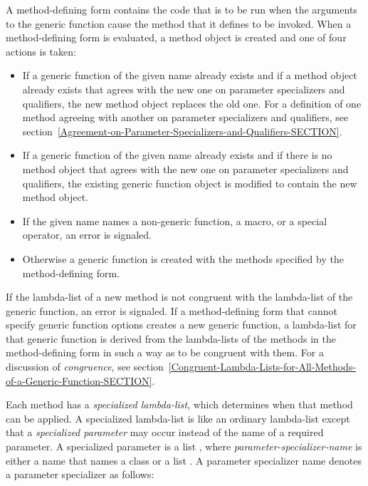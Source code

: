 A method-defining form contains the code that is to be run when the
arguments to the generic function cause the method that it defines to
be invoked.  When a method-defining form is evaluated, a method object
is created and one of four actions is taken:

\begin{itemize}

\item  If a generic function of the given name already exists
and if a method object already exists that agrees with the new one on
parameter specializers and qualifiers, the new method object replaces
the old one.  For a definition of one method agreeing with another on
parameter specializers and qualifiers, see
section~\ref{Agreement-on-Parameter-Specializers-and-Qualifiers-SECTION}.

\item  If a generic function of the given name already exists
and if there is no method object that agrees with the new one on
parameter specializers and qualifiers, the existing generic function
object is modified to contain the new method object.

\item  If the given name names a non-generic function, a macro,
or a special operator, an error is signaled.

\item  Otherwise a generic function is created with the methods
specified by the method-defining form.

\end{itemize}

If the lambda-list of a new method is not congruent with the lambda-list
of the generic function, an error is signaled.  If a
method-defining form that cannot specify generic function options
creates a new generic function, a lambda-list for that generic
function is derived from the lambda-lists of the methods in the
method-defining form in such a way as to be congruent with them.  For
a discussion of \emph{congruence}, see
section~\ref{Congruent-Lambda-Lists-for-All-Methods-of-a-Generic-Function-SECTION}.

Each method has a \emph{specialized lambda-list}, which determines
when that method can be applied.  A specialized lambda-list is like
an ordinary lambda-list except that a \emph{specialized parameter\/}
may occur instead of the name of a required parameter.  A specialized parameter
is a list ,
where \emph{parameter-specializer-name\/} is either
a name that names a class or a list .
A parameter specializer name denotes a parameter specializer as follows:

